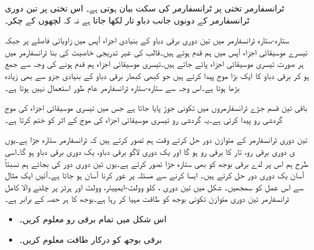 ٹرانسفارمر  تختی پر ٹرانسفارمر کی سکت بیان ہوتی ہے۔ اس تختی پر تین دوری ٹرانسفارمر کے دونوں جانب  دباو تار  لکھا جاتا ہے  نہ کہ لچھوں کے چکر۔

ستارہ-ستارہ ٹرانسفارمر میں تین دوری برقی دباو  کے بنیادی اجزاء آپس میں   زاویائی فاصلے پر جبکہ  تیسرے موسیقائی اجزاء آپس میں ہم قدم ہوتے ہیں۔قالب کی غیر تدریجی خاصیت کی بنا ٹرانسفارمر میں ہر صورت تیسری موسیقائی اجزاء پائے جاتے ہیں۔تیسری موسیقائی اجزاء ہم قدم ہونے کی وجہ سے جمع ہو کر  برقی دباو کا ایک بڑا موج پیدا کرتے ہیں جو کبھی کبھار برقی دباو کے بنیادی جزو سے بھی زیادہ بڑھا ہوتا ہے۔اس وجہ سے ستارہ-ستارہ  ٹرانسفارمر عام طور استعمال نہیں ہوتا ہے۔

باقی تین قسم جڑے ٹرانسفارمروں میں تکونی جوڑ پایا جاتا ہے جس میں تیسری موسیقائی اجزاء کی موج گردشی رو پیدا کرتی ہے۔یہ گردشی رو تیسری موسیقائی اجزاء کی موج کے اثر کو ختم کرتا ہے۔



تین دوری ٹرانسفارمر کے متوازن دور حل کرتے وقت ہم تصور کرتے ہیں کہ ٹرانسفارمر ستارہ جڑا  ہے۔یوں ی دوری برقی رو، تار  کا برقی رو ہو گا اور یک دوری لاگو برقی دباو، یک دوری برقی دباو  ہو گا۔اسی طرح ہم اس پر لدے برقی بوجھ کو بھی ستارہ جڑا تصور کرتے ہے۔یوں تین دوری دور کی بجائے  ہم نسبتاً آسان یک دوری دور حل کرتے ہیں۔ ایسا کرنے سے مسئلہ پر غور کرنا آسان ہو جاتا ہے۔آئیں ایک مثال سے اس عمل کو  سمجھیں۔
%
شکل   میں تین دوری ،    کلو وولٹ-ایمپیئر،    وولٹ اور  ہرٹز پر چلنے والا کامل ٹرانسفارمر تین دوری متوازن تکونی بوجھ کو طاقت مہیا کر رہا ہے۔بوجھ کا ہر حصہ  کے برابر ہے۔
\begin{itemize}
\item
اس شکل میں تمام برقی رو معلوم کریں۔
\item
برقی بوجھ کو درکار طاقت معلوم کریں۔
\end{itemize}

